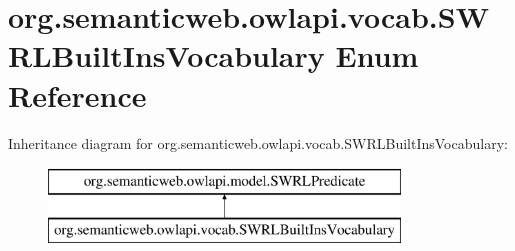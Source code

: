 \hypertarget{enumorg_1_1semanticweb_1_1owlapi_1_1vocab_1_1_s_w_r_l_built_ins_vocabulary}{\section{org.\-semanticweb.\-owlapi.\-vocab.\-S\-W\-R\-L\-Built\-Ins\-Vocabulary Enum Reference}
\label{enumorg_1_1semanticweb_1_1owlapi_1_1vocab_1_1_s_w_r_l_built_ins_vocabulary}
}
Inheritance diagram for org.\-semanticweb.\-owlapi.\-vocab.\-S\-W\-R\-L\-Built\-Ins\-Vocabulary\-:\begin{figure}[H]
\begin{center}
\leavevmode
\includegraphics[height=2.000000cm]{enumorg_1_1semanticweb_1_1owlapi_1_1vocab_1_1_s_w_r_l_built_ins_vocabulary}
\end{center}
\end{figure}
